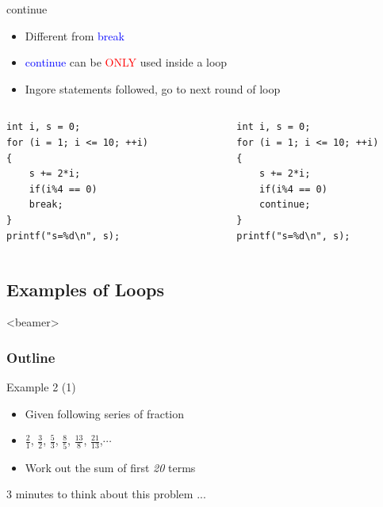 \begin{frame}[fragile]{continue}
\begin{itemize}
	\item {Different from \textcolor{blue}{break}}
	\item {\textcolor{blue}{continue} can be \textcolor{red}{ONLY} used inside a loop}
	\item {Ingore statements followed, go to next round of loop}
\end{itemize}
\begin{columns}
\begin{column}{0.48\linewidth}
\begin{lstlisting}
int i, s = 0;
for (i = 1; i <= 10; ++i)
{
    s += 2*i;
    if(i%4 == 0)
    break;
}
printf("s=%d\n", s);
\end{lstlisting}
\end{column}
\begin{column}{0.02\linewidth}
\end{column}
\begin{column}{0.45\linewidth}
\begin{lstlisting}
int i, s = 0;
for (i = 1; i <= 10; ++i)
{
    s += 2*i;
    if(i%4 == 0)
    continue;
}
printf("s=%d\n", s);
\end{lstlisting}
\end{column}
\end{columns}
\end{frame}

\subsection{Examples of Loops}
\begin{frame}<beamer>
    \frametitle{Outline}
\end{frame}

\begin{frame}[fragile]{Example 2 (1)}
\begin{itemize}
	\item {Given following series of fraction}
	\item {$\frac{2}{1}$, $\frac{3}{2}$, $\frac{5}{3}$, $\frac{8}{5}$, $\frac{13}{8}$, $\frac{21}{13}$,$\cdots$}
	\item {Work out the sum of first \textit{20} terms}
\end{itemize}

\begin{center}
	\Large{3 minutes to think about this problem ...}
\end{center}
\end{frame}

